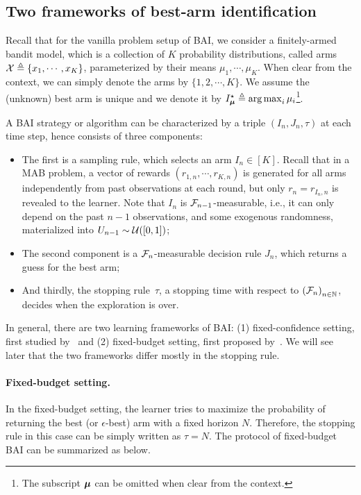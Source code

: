 \subsection{Two frameworks of best-arm identification}\label{sec:mab.bai.frameworks}

Recall that for the vanilla problem setup of BAI, we consider a finitely-armed bandit model, which is a collection of $K$ probability distributions, called arms $\mathcal{X}\triangleq\{x_1,\cdots,x_K\}$, parameterized by their means $\mu_1, \cdots, \mu_K$. When clear from the context, we can simply denote the arms by $\{1,2,\cdots,K\}$. We assume the (unknown) best arm is unique and we denote it by $I_{{\boldsymbol \mu}}^\star \triangleq \operatorname*{arg\,max}_i \mu_i$\footnote{The subscript ${\boldsymbol \mu}$ can be omitted when clear from the context.}. 

A BAI strategy or algorithm can be characterized by a triple $(I_n, J_n, \tau)$ at each time step, hence consists of three components: 
\begin{itemize}
    \item The first is a \gls{sampling rule}, which selects an arm $I_n\in[K]$. Recall that in a MAB problem, a vector of rewards $(r_{1,n},\cdots,r_{K,n})$ is generated for all arms independently from past observations at each round, but only $r_n = r_{I_n,n}$ is revealed to the learner. Note that $I_n$ is $\mathcal{F}_{n-1}$-measurable, i.e., it can only depend on the past $n-1$ observations, and some exogenous randomness, materialized into $U_{n-1} \sim \mathcal{U}([0,1])$;
    \item The second component is a $\mathcal{F}_{n}$-measurable \gls{decision rule} $J_n$, which returns a guess for the best arm;
    \item And thirdly, the \gls{stopping rule}~$\tau$, a stopping time with respect to $\left(\mathcal{F}_{n}\right)_{n \in \mathbb{N}}$, decides when the exploration is over.
\end{itemize}

In general, there are two learning frameworks of BAI: (1) \gls{fixed-confidence setting}, first studied by~\citep{even-dar2003confidence} and (2) \gls{fixed-budget setting}, first proposed by~\citep{audibert2010budget}. We will see later that the two frameworks differ mostly in the stopping rule.

\paragraph{Fixed-budget setting.}

In the fixed-budget setting, the learner tries to maximize the probability of returning the best (or $\epsilon$-best) arm with a fixed horizon $N$. Therefore, the stopping rule in this case can be simply written as $\tau=N$. The protocol of fixed-budget BAI can be summarized as below.


